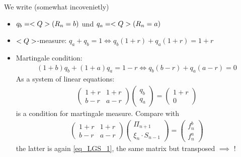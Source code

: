 \begin{*remark}
	We write (somewhat incovenietly)
	\begin{itemize}
		\item $q_b = <Q>(R_n = b)$ und $q_a = <Q>(R_n = a)$
		\item $<Q>$-measure: $q_a + q_b = 1 \Leftrightarrow q_b(1+r) + q_a (1+r) = 1+r$
		\item Martingale condition:
		\begin{align*}
			(1+b)q_b + (1+a)q_a = 1-r \Leftrightarrow q_b(b-r) + q_a(a-r) = 0
		\end{align*}
		As a system of linear equations:
		\begin{align*}
			\begin{pmatrix}
				1+r & 1+r \\
				b-r & a-r
			\end{pmatrix}
			\begin{pmatrix}
				q_b\\ q_a
			\end{pmatrix} =
			\begin{pmatrix}
				1+r\\ 0
			\end{pmatrix} \tag{SLE-2}\label{eq_2_4_LGS2}
		\end{align*}
		is a condition for martingale measure. Compare with 
		\begin{align*}
			\begin{pmatrix}
				1+r & 1+r \\
				b-r & a-r
			\end{pmatrix}
			\begin{pmatrix}
				\Pi_{n+1}\\ \xi_n \cdot S_{n-1}
			\end{pmatrix} =
			\begin{pmatrix}
				f_n^b\\ f_n^a
			\end{pmatrix}
		\end{align*}
		the latter is again \eqref{eq_LGS_1}, the same matrix but transposed $\implies$ !
	\end{itemize}  
\end{*remark}
